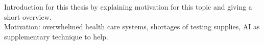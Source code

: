 \begin{changemargin}{50pt}{50pt}
Introduction for this thesis by explaining motivation for this topic and giving a short overview.
    \\
    Motivation: overwhelmed health care systems, shortages of testing supplies, AI as supplementary technique to help.
\end{changemargin}